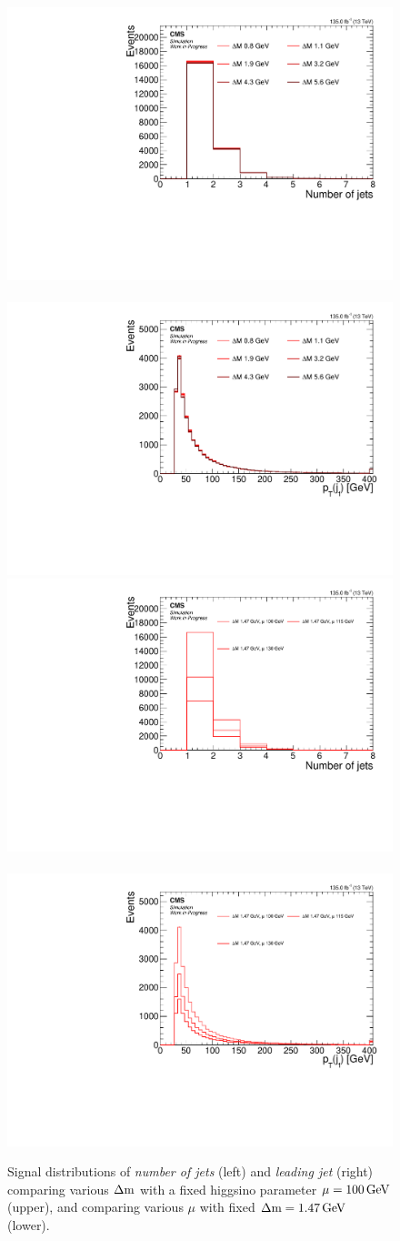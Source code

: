 \begin{figure}[!htb]
\centering
\includegraphics[width=0.48\linewidth]{plots/signal_common_distributions_fixed_mu/none_NJets.pdf} \,
\includegraphics[width=0.48\linewidth]{plots/signal_common_distributions_fixed_mu/none_LeadingJetPt.pdf}  \\
\includegraphics[width=0.48\linewidth]{plots/signal_common_distributions_fixed_dm/none_NJets.pdf} \,
\includegraphics[width=0.48\linewidth]{plots/signal_common_distributions_fixed_dm/none_LeadingJetPt.pdf}  \\
\caption[Signal \emph{number of jets} and \emph{leading jet \pt} distributions]{ Signal distributions of \emph{number of jets} (left) and \emph{leading jet \pt} (right) comparing various $\Delta\mathrm{m}$ with a fixed higgsino parameter $\mu=100\,\text{Ge\hspace{-.08em}V}$ (upper), and comparing various $\mu$ with fixed $\Delta\mathrm{m}=1.47\,\text{Ge\hspace{-.08em}V}$ (lower).}
\label{fig:signal-njets-ljpt}
\end{figure}

